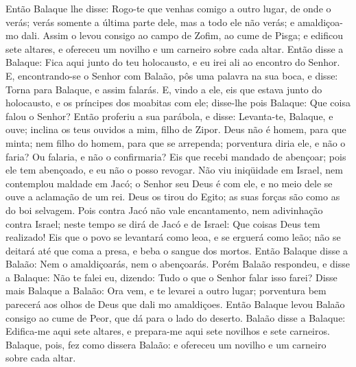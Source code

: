 Então Balaque lhe disse: Rogo-te que venhas comigo a outro lugar,
de onde o verás; verás somente a última parte dele, mas a todo ele
não verás; e amaldiçoa-mo dali. Assim o levou consigo ao
campo de Zofim, ao cume de Pisga; e edificou sete altares, e
ofereceu um novilho e um carneiro sobre cada altar. Então
disse a Balaque: Fica aqui junto do teu holocausto, e eu irei ali ao
encontro do Senhor. E, encontrando-se o Senhor com Balaão,
pôs uma palavra na sua boca, e disse: Torna para Balaque, e assim
falarás. E, vindo a ele, eis que estava junto do holocausto,
e os príncipes dos moabitas com ele; disse-lhe pois Balaque: Que
coisa falou o Senhor? Então proferiu a sua parábola, e disse:
Levanta-te, Balaque, e ouve; inclina os teus ouvidos a mim, filho de
Zipor. Deus não é homem, para que minta; nem filho do homem,
para que se arrependa; porventura diria ele, e não o faria? Ou
falaria, e não o confirmaria? Eis que recebi mandado de
abençoar; pois ele tem abençoado, e eu não o posso revogar.
Não viu iniqüidade em Israel, nem contemplou maldade em Jacó;
o Senhor seu Deus é com ele, e no meio dele se ouve a aclamação de
um rei. Deus os tirou do Egito; as suas forças são como as do
boi selvagem. Pois contra Jacó não vale encantamento, nem
adivinhação contra Israel; neste tempo se dirá de Jacó e de Israel:
Que coisas Deus tem realizado! Eis que o povo se levantará
como leoa, e se erguerá como leão; não se deitará até que coma a
presa, e beba o sangue dos mortos. Então Balaque disse a
Balaão: Nem o amaldiçoarás, nem o abençoarás. Porém Balaão
respondeu, e disse a Balaque: Não te falei eu, dizendo: Tudo o que o
Senhor falar isso farei? Disse mais Balaque a Balaão: Ora
vem, e te levarei a outro lugar; porventura bem parecerá aos olhos
de Deus que dali mo amaldiçoes. Então Balaque levou Balaão
consigo ao cume de Peor, que dá para o lado do deserto.
Balaão disse a Balaque: Edifica-me aqui sete altares, e
prepara-me aqui sete novilhos e sete carneiros. Balaque,
pois, fez como dissera Balaão: e ofereceu um novilho e um carneiro
sobre cada altar.

\medskip

